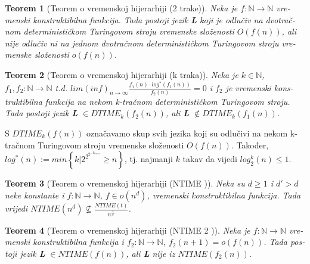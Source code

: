 \documentclass[12pt]{rectors}
\newtheorem{theorem}{Teorem}[section]
\begin{document}
\begin{otherlanguage}{croatian}
\begin{theorem}[Teorem o vremenskoj hijerarhiji (2 trake)]
	Neka je $f : \mathbb{N} \to \mathbb{N}$ vremenski konstruktibilna funkcija. Tada postoji jezik \textbf{L} koji je odlučiv na dvotračnom determinističkom Turingovom stroju vremenske složenosti $O(f\left ( n \right ) )$, ali nije odlučiv ni na jednom dvotračnom determinističkom Turingovom stroju vremenske složenosti $o(f\left ( n \right ))$.
\end{theorem}

\begin{theorem}[Teorem o vremenskoj hijerarhiji (k traka)]
	Neka je $k \in \mathbb{N}$, $f_1,f_2 : \mathbb{N} \to \mathbb{N}$ t.d. 
	$lim (inf)_{n \to \infty} \frac{f_1(n) \cdot log^*(f_1(n))}{f_2(n)} = 0$ i $f_2$ je vremenski konstruktibilna funkcija na nekom k-tračnom determinističkom Turingovom stroju. Tada postoji jezik \textbf{L} $\in DTIME_k(f_2\left ( n \right ) )$, ali \textbf{L} $\notin DTIME_k(f_1\left ( n \right ) )$.
\end{theorem}
S $DTIME_k(f(n))$ označavamo skup svih jezika koji su odlučivi na nekom k-tračnom Turingovom stroju vremenske složenosti $O(f(n))$.
Također, $log^*(n) := min \left \{k | 2^{2^{2^{... k_{times}}}} \geq n \right \} $, tj. najmanji $k$ takav da vijedi
$log_2^k(n) \leq 1$.

\begin{theorem}[Teorem o vremenskoj hijerarhiji (NTIME \cite{teoremntime})]
Neka su $d \geq 1$ i $ d' > d$ neke konstante i $f : \mathbb{N} \to \mathbb{N}$, $f \in o(n^d)$, vremenski konstruktibilna funkcija. Tada vrijedi $NTIME(n^d) \not \subseteq \frac{NTIME(t)}{n^{\frac{1}{d'}}} $.
\end{theorem}

\begin{theorem}[Teorem o vremenskoj hijerarhiji (NTIME 2 \cite{teoremntime2})]
	Neka je $f : \mathbb{N} \to \mathbb{N}$ vremenski konstruktibilna funkcija i
	$f_2: \mathbb{N} \to \mathbb{N} $, $f_2(n+1) = o(f(n))$. Tada postoji jezik \textbf{L} $\in NTIME(f\left ( n \right ) )$, ali \textbf{L} nije iz $NTIME(f_2\left ( n \right ) )$.
\end{theorem}

\end{otherlanguage}
\end{document}
